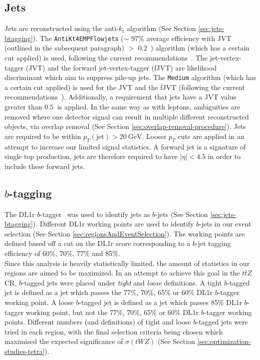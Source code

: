 \subsection{Jets}
Jets are reconstructed using the anti-$k_{t}$ algorithm (See Section \ref{sec:jets-btagging}). The \texttt{AntiKt4EMPFlowjets} ($\sim$ 97$\%$ average efficiency with JVT (outlined in the subsequent paragraph) $>$ 0.2~\cite{TopRecoObjTwikiModel}) algorithm (which has a certain cut applied) is used, following the current recommendations~\cite{TopRecoObjTwikiModel}. The jet-vertex-tagger (JVT) and the forward jet-vertex-tagger (fJVT) are likelihood discriminant which aim to suppress pile-up jets. The \texttt{Medium} algorithm (which has a certain cut applied) is used for the JVT and the fJVT (following the current recommendations~\cite{JVTandfJVT-Recommendations}). Additionally, a requirement that jets have a JVT value greater than $\SI{0.5}{}$ is applied. In the same way as with leptons, ambiguities are removed where one detector signal can result in multiple different reconstructed objects, via overlap removal (See Section \ref{sec:overlap-removal-procedure}). Jets are required to be within $p_{T}(\text{jet}) > \SI{20}{\GeV}$. Looser $p_T$ cuts are applied in an attempt to increase our limited signal statistics. A forward jet is a signature of single top production, jets are therefore required to have $|\eta| < 4.5$ in order to include these forward jets.


\subsection{$b$-tagging}
The DL1r $b$-tagger~\cite{DL1r-paper} was used to identify jets as $b$-jets (See Section \ref{sec:jets-btagging}). Different DL1r working points are used to identify $b$-jets in our event selection (See Section \ref{sec:regionsAndEventSelection}). The working points are defined based off a cut on the DL1r score corresponding to a $b$-jet tagging efficiency of 60$\%$, 70$\%$, 77$\%$ and 85$\%$. \\

Since this analysis is heavily statistically limited, the amount of statistics in our regions are aimed to be maximized. In an attempt to achieve this goal in the $t\bar{t}Z$ CR, $b$-tagged jets were placed under \textit{tight} and \textit{loose} definitions. A tight $b$-tagged jet is defined as a jet which passes the 77$\%$, 70$\%$, 65$\%$ or 60$\%$ DL1r $b$-tagger working point. A loose $b$-tagged jet is defined as a jet which passes 85$\%$ DL1r $b$-tagger working point, but not the 77$\%$, 70$\%$, 65$\%$ or 60$\%$ DL1r $b$-tagger working points. Different numbers (and definitions) of tight and loose $b$-tagged jets were tried in each region, with the final selection criteria being chosen which maximised the expected significance of $\sigma(tWZ)$ (See Section \ref{sec:optimization-studies-tetra}).

